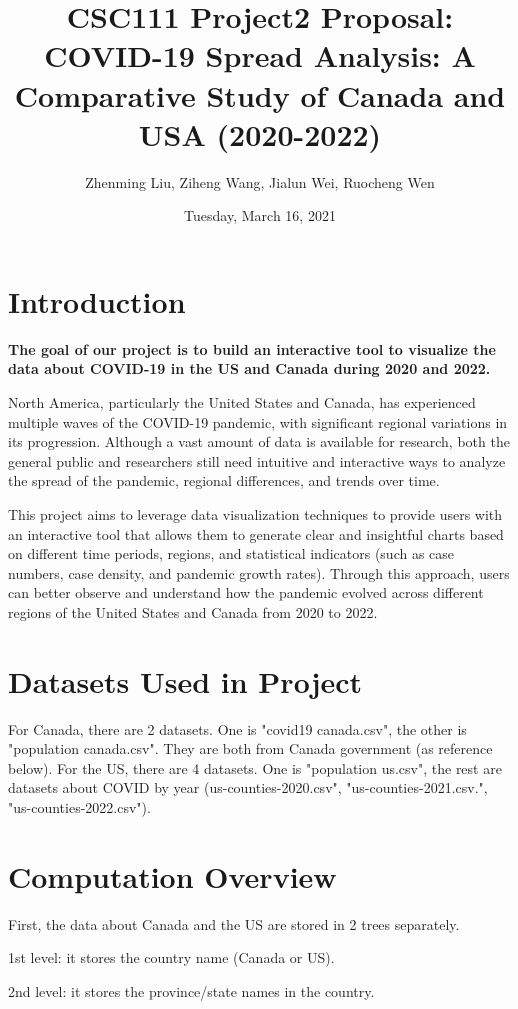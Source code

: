 \documentclass[fontsize=11pt]{article}
\title{CSC111 Project2 Proposal: COVID-19 Spread Analysis: A Comparative Study of Canada and USA (2020-2022)}
\author{Zhenming Liu, Ziheng Wang, Jialun Wei, Ruocheng Wen}
\date{Tuesday, March 16, 2021}
\begin{document}
\maketitle

\section*{Introduction}

\textbf{The goal of our project is to build an interactive tool to visualize the data about COVID-19 in the US and Canada during 2020 and 2022.} 

North America, particularly the United States and Canada, has experienced multiple waves of the COVID-19 pandemic, with significant regional variations in its progression. Although a vast amount of data is available for research, both the general public and researchers still need intuitive and interactive ways to analyze the spread of the pandemic, regional differences, and trends over time.

This project aims to leverage data visualization techniques to provide users with an interactive tool that allows them to generate clear and insightful charts based on different time periods, regions, and statistical indicators (such as case numbers, case density, and pandemic growth rates). Through this approach, users can better observe and understand how the pandemic evolved across different regions of the United States and Canada from 2020 to 2022.

\section*{Datasets Used in Project}
For Canada, there are 2 datasets. One is "covid19 canada.csv", the other is "population canada.csv". They are both from Canada government (as reference below). For the US, there are 4 datasets. One is "population us.csv", the rest are datasets about COVID by year (us-counties-2020.csv", "us-counties-2021.csv.", "us-counties-2022.csv").

\section*{Computation Overview}
First, the data about Canada and the US are stored in 2 trees separately.  

        1st level: it stores the country name (Canada or US).
        
        2nd level: it stores the province/state names in the country.
        
\end{document}
